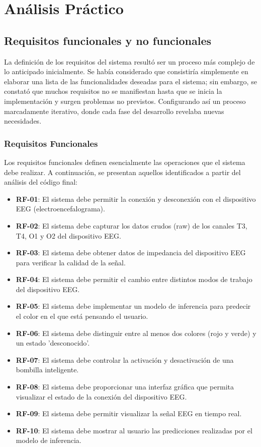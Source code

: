 \chapter{Análisis Práctico}\label{ch:practical_analytics}

\section{Requisitos funcionales y no funcionales}

La definición de los requisitos del sistema resultó ser un proceso más complejo de lo anticipado inicialmente. Se había considerado que consistiría simplemente en elaborar una lista de las funcionalidades deseadas para el sistema; sin embargo, se constató que muchos requisitos no se manifiestan hasta que se inicia la implementación y surgen problemas no previstos. Configurando así un proceso marcadamente iterativo, donde cada fase del desarrollo revelaba nuevas necesidades.

\subsection{Requisitos Funcionales}

Los requisitos funcionales definen esencialmente las operaciones que el sistema debe realizar. A continuación, se presentan aquellos identificados a partir del análisis del código final:

\begin{itemize}
    \item \textbf{RF-01}: El sistema debe permitir la conexión y desconexión con el dispositivo EEG (electroencefalograma).
    \item \textbf{RF-02}: El sistema debe capturar los datos crudos (raw) de los canales T3, T4, O1 y O2 del dispositivo EEG.
    \item \textbf{RF-03}: El sistema debe obtener datos de impedancia del dispositivo EEG para verificar la calidad de la señal.
    \item \textbf{RF-04}: El sistema debe permitir el cambio entre distintos modos de trabajo del dispositivo EEG.
    \item \textbf{RF-05}: El sistema debe implementar un modelo de inferencia para predecir el color en el que está pensando el usuario.
    \item \textbf{RF-06}: El sistema debe distinguir entre al menos dos colores (rojo y verde) y un estado 'desconocido'.
    \item \textbf{RF-07}: El sistema debe controlar la activación y desactivación de una bombilla inteligente.
    \item \textbf{RF-08}: El sistema debe proporcionar una interfaz gráfica que permita visualizar el estado de la conexión del dispositivo EEG.
    \item \textbf{RF-09}: El sistema debe permitir visualizar la señal EEG en tiempo real.
    \item \textbf{RF-10}: El sistema debe mostrar al usuario las predicciones realizadas por el modelo de inferencia.
\end{itemize}

